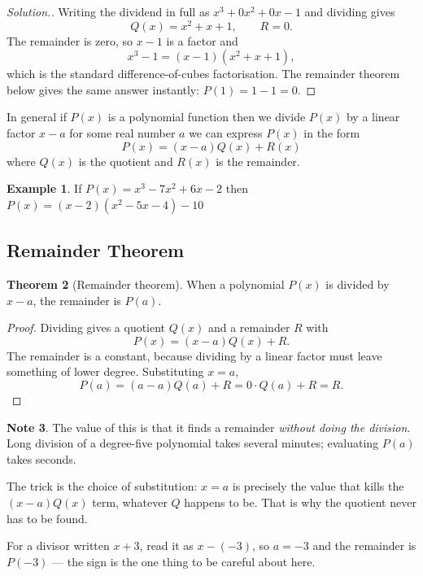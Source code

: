 \documentclass[11pt,a4paper]{article}
\theoremstyle{definition}
\newtheorem{thm}{Theorem}[section]
\newtheorem{example}[thm]{Example}
\newtheorem{note}[thm]{Note}
\newenvironment{solution}
  {\renewcommand{\qedsymbol}{}\begin{proof}[\textit{Solution}.]}
  {\end{proof}}
\begin{document}
\begin{solution}
Writing the dividend in full as $x^{3}+0x^{2}+0x-1$ and dividing gives
$$Q(x)=x^{2}+x+1,\qquad R=0 .$$
The remainder is zero, so $x-1$ is a factor and
$$x^{3}-1=(x-1)\left(x^{2}+x+1\right),$$
which is the standard difference-of-cubes factorisation. The remainder theorem
below gives the same answer instantly: $P(1)=1-1=0$.
\end{solution}


In general if $P(x)$ is a polynomial function then we divide $P(x)$ by a linear factor $x-a$ for some real number $a$ we can express $P(x)$ in the form $$P(x)=(x-a)Q(x)+R(x)$$ where $Q(x)$ is the quotient and $R(x)$ is the remainder.\\

\begin{example}

If $P(x)=x^3-7x^2+6x-2$ then $P(x)=(x-2)(x^2-5x-4)-10$
\end{example}
\subsection{Remainder Theorem}
\begin{thm}[Remainder theorem]
When a polynomial $P(x)$ is divided by $x-a$, the remainder is $P(a)$.
\end{thm}

\begin{proof}
Dividing gives a quotient $Q(x)$ and a remainder $R$ with
$$P(x)=(x-a)Q(x)+R .$$
The remainder is a constant, because dividing by a linear factor must leave
something of lower degree. Substituting $x=a$,
$$P(a)=(a-a)Q(a)+R=0\cdot Q(a)+R=R .$$
\end{proof}

\begin{note}
The value of this is that it finds a remainder \emph{without doing the division}.
Long division of a degree-five polynomial takes several minutes; evaluating $P(a)$
takes seconds.

The trick is the choice of substitution: $x=a$ is precisely the value that kills
the $(x-a)Q(x)$ term, whatever $Q$ happens to be. That is why the quotient never
has to be found.

For a divisor written $x+3$, read it as $x-(-3)$, so $a=-3$ and the remainder is
$P(-3)$ --- the sign is the one thing to be careful about here.
\end{note}
\end{document}
